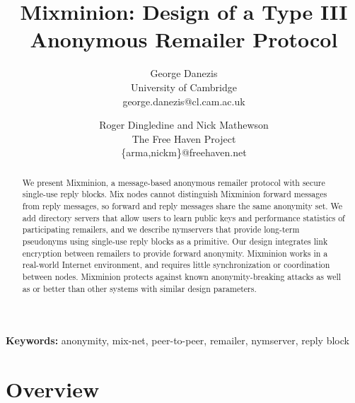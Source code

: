 \documentclass[final,inpress,inline]{ieee}
\newcommand\emailaddr{\begingroup \def\UrlLeft{<}\def\UrlRight{>}\urlstyle{tt}\Url}
\begin{document}

\title{Mixminion: Design of a Type III Anonymous Remailer Protocol}

\author{George Danezis \\ University of Cambridge \\ george.danezis@cl.cam.ac.uk \and
Roger Dingledine and Nick Mathewson \\ The Free Haven Project \\ \{arma,nickm\}@freehaven.net}

\maketitle
\pagestyle{plain} 
 
\begin{abstract}
We present Mixminion, a message-based anonymous remailer protocol with
secure single-use reply blocks. Mix nodes cannot distinguish
Mixminion forward messages from reply messages, so forward and reply
messages share
the same anonymity set. We add directory servers that allow users to
learn public keys and performance statistics of participating remailers,
and we describe nymservers that provide long-term
pseudonyms using single-use reply blocks as a primitive. Our design
integrates link encryption between remailers to provide
forward anonymity. Mixminion works in a real-world Internet environment,
and requires little synchronization or coordination between nodes.
Mixminion protects against known anonymity-breaking attacks as well
as or better than other systems with similar design parameters.
\end{abstract}

\begin{center}
\textbf{Keywords:} anonymity, mix-net, peer-to-peer, remailer, nymserver, reply block
\end{center}


\section{Overview}
\label{sec:intro}
\end{document}
